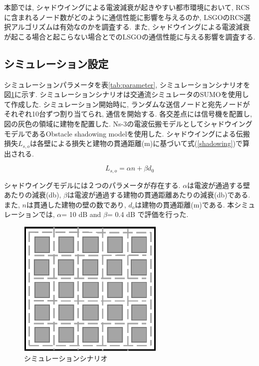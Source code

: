 \documentclass[10pt]{jreport}
\begin{document}
本節では, シャドウイングによる電波減衰が起きやすい都市環境において, RCSに含まれるノード数がどのように通信性能に影響を与えるのか, LSGOのRCS選択アルゴリズムは有効なのかを調査する.
また, シャドウイングによる電波減衰が起こる場合と起こらない場合とでのLSGOの通信性能に与える影響を調査する.

\subsection{シミュレーション設定}
シミュレーションパラメータを表\ref{tab:parameter}, シミュレーションシナリオを図\ref{fig:Scenario}に示す. シミュレーションシナリオは交通流シミュレータのSUMO\cite{27}を使用して作成した. シミュレーション開始時に, ランダムな送信ノードと宛先ノードがそれぞれ10台ずつ割り当てられ, 通信を開始する. 各交差点には信号機を配置し, 図の灰色の領域に建物を配置した. 
Ns-3の電波伝搬モデルとしてシャドウイングモデルであるObstacle shadowing model\cite{20}を使用した. シャドウイングによる伝搬損失$L_{s,o}$は各壁による損失と建物の貫通距離(m)に基づいて式(\ref{shadowing})で算出される.

\begin{equation}
	\label{shadowing}
	L_{s,o} = \alpha n  + \beta d_0
\end{equation}

シャドウイングモデルには２つのパラメータが存在する. $\alpha$は電波が通過する壁あたりの減衰(db), $\beta$は電波が通過する建物の貫通距離あたりの減衰(db)である. また, $n$は貫通した建物の壁の数であり, $d_{o}$は建物の貫通距離(m)である.
本シミュレーションでは, $\alpha$= 10 dB and $\beta$= 0.4 dB で評価を行った. 

\begin{figure}[!ht]
	\centering
	\includegraphics[width=70mm]{figures/Scenario.eps}
	\caption{シミュレーションシナリオ}
	\label{fig:Scenario}
\end{figure}
\end{document}
